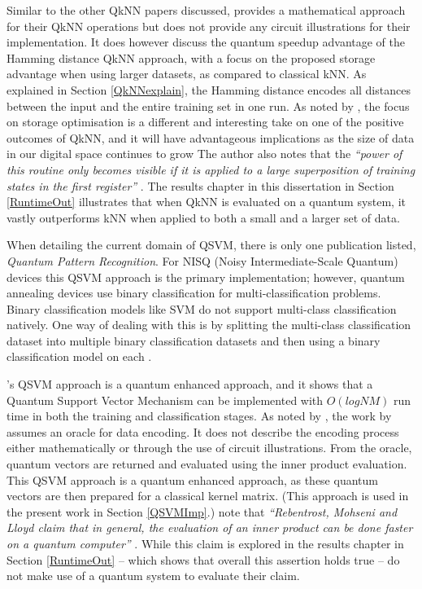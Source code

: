 Similar to the other QkNN papers discussed, \citeauthor{trugenbergersubQkNNHamm} provides a mathematical approach for their QkNN operations but does not provide any circuit illustrations for their implementation. It does however discuss the quantum speedup advantage of the Hamming distance QkNN approach, with a focus on the proposed storage advantage when using larger datasets, as compared to classical kNN. As explained in Section \ref{QkNNexplain}, the Hamming distance encodes all distances between the input and the entire training set in one run. As noted by \citep{research1}, the focus on storage optimisation is a different and interesting take on one of the positive outcomes of QkNN, and it will have advantageous implications as the size of data in our digital space continues to grow %
The author also notes that the \emph{``power of this routine only becomes visible if it is applied to a large superposition of training states in the first register''} \citep{research1}. The results chapter in this dissertation in Section \ref{RuntimeOut} illustrates that when QkNN is evaluated on a quantum system, it vastly outperforms kNN when applied to both a small and a larger set of data.

When detailing the current domain of QSVM, there is only one publication listed, \citep{Rebentrost_2014SubSVM} \emph{Quantum Pattern Recognition}. For NISQ (Noisy 
Intermediate-Scale Quantum) devices this QSVM approach is the primary implementation; however, quantum annealing devices \citep{QAnnealing} use binary classification for multi-classification problems. Binary classification models like SVM do not support multi-class classification natively. One way of dealing with this is by splitting the multi-class classification dataset into multiple binary classification datasets and then using a binary classification model on each \citep{demasupport}. %

\citeauthor{Rebentrost_2014SubSVM}'s QSVM approach is a quantum enhanced approach, and it shows that a Quantum Support Vector Mechanism can be implemented with $ O(log N M)$ run time in both the training and classification stages.
As noted by \citeauthor{research1}, the work by \citeauthor{Rebentrost_2014SubSVM} assumes an oracle for data encoding. It does not describe the encoding process either mathematically or through the use of circuit illustrations.
From the oracle, quantum vectors are returned and evaluated using the inner product evaluation. %
This QSVM approach is a quantum enhanced approach, as these quantum vectors are then prepared for a classical kernel matrix. (This approach is used in the present work in Section \ref{QSVMImp}.)
\citeauthor{research1} note that \emph{``Rebentrost, Mohseni and Lloyd claim that in general, the evaluation of an inner product can be done faster on a quantum computer''} \citep{research1}. While this claim is explored in the results chapter in Section \ref{RuntimeOut} -- which shows that overall this assertion holds true -- \citeauthor{Rebentrost_2014SubSVM} do not make use of a quantum system to evaluate their claim. 

